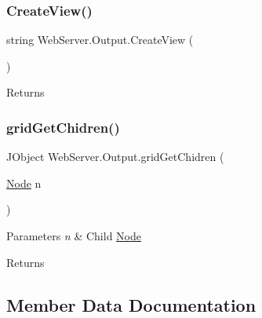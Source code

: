 \subsubsection{\texorpdfstring{Create\+View()}{CreateView()}}
{\footnotesize\ttfamily string Web\+Server.\+Output.\+Create\+View (\begin{DoxyParamCaption}{ }\end{DoxyParamCaption})}





\begin{DoxyReturn}{Returns}

\end{DoxyReturn}
\mbox{\label{class_web_server_1_1_output_a236a91df7171746a519133dfdc578777}} 
\subsubsection{\texorpdfstring{grid\+Get\+Chidren()}{gridGetChidren()}}
{\footnotesize\ttfamily J\+Object Web\+Server.\+Output.\+grid\+Get\+Chidren (\begin{DoxyParamCaption}\item[{\hyperlink{class_web_server_1_1_node}{Node}}]{n }\end{DoxyParamCaption})\hspace{0.3cm}{\ttfamily [private]}}






\begin{DoxyParams}{Parameters}
{\em n} & Child \hyperlink{class_web_server_1_1_node}{Node}\\
\hline
\end{DoxyParams}
\begin{DoxyReturn}{Returns}

\end{DoxyReturn}


\subsection{Member Data Documentation}
\mbox{\label{class_web_server_1_1_output_a8ff5484358c14b3f8479056f1b978790}} 
